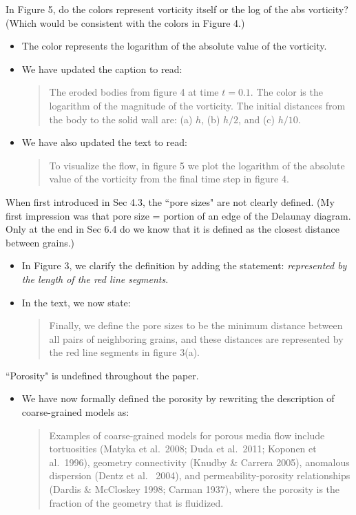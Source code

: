 \documentclass[11pt]{article}
\newcommand{\comment}[1]{{\color{blue} #1}}
\begin{document}
\noindent
\comment{In Figure 5, do the colors represent vorticity itself or the
log of the abs vorticity? (Which would be consistent with the colors in
Figure 4.)}
\begin{itemize}
  \item The color represents the logarithm of the absolute value of the
    vorticity.
  \item We have updated the caption to read:
    \begin{quotation}
    \noindent
      The eroded bodies from figure 4 at time $t = 0.1$. The color is
      the logarithm of the magnitude of the vorticity. The initial
      distances from the body to the solid wall are: (a) $h$, (b) $h/2$,
      and (c) $h/10$.
    \end{quotation}
  \item We have also updated the text to read:
    \begin{quotation}
    \noindent
      To visualize the flow, in figure 5 we plot the logarithm of the
      absolute value of the vorticity from the final time step in figure
      4.
    \end{quotation}
\end{itemize}

\noindent
\comment{When first introduced in Sec 4.3, the ``pore sizes" are not
clearly defined. (My first impression was that pore size = portion of an
edge of the Delaunay diagram. Only at the end in Sec 6.4 do we know that
it is defined as the closest distance between grains.)}
\begin{itemize}
  \item In Figure 3, we clarify the definition by adding the statement:
    {\em represented by the length of the red line segments}.
  \item In the text, we now state:
    \begin{quotation}
    \noindent
      Finally, we define the pore sizes to be the minimum distance
      between all pairs of neighboring grains, and these distances are
      represented by the red line segments in figure 3(a).
    \end{quotation}
\end{itemize}

\noindent
\comment{``Porosity" is undefined throughout the paper.}
\begin{itemize}
  \item We have now formally defined the porosity by rewriting the
    description of coarse-grained models as:
  \begin{quotation}
  \noindent
    Examples of coarse-grained models for porous media flow include
    tortuosities (Matyka et al.~2008; Duda et al.~2011; Koponen et
    al.~1996), geometry connectivity (Knudby \& Carrera 2005), anomalous
    dispersion (Dentz et al.~ 2004), and permeability-porosity
    relationships (Dardis \& McCloskey 1998; Carman 1937), where the
    porosity is the fraction of the geometry that is fluidized.
  \end{quotation}


\end{itemize}
\end{document}
